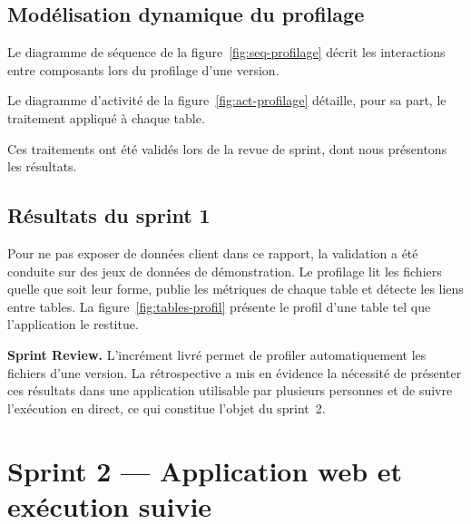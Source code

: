 \subsection{Modélisation dynamique du profilage}

Le diagramme de séquence de la figure~\ref{fig:seq-profilage} décrit les interactions entre composants lors du profilage d'une version.


Le diagramme d'activité de la figure~\ref{fig:act-profilage} détaille, pour sa part, le traitement appliqué à chaque table.


Ces traitements ont été validés lors de la revue de sprint, dont nous présentons les résultats.

\subsection{Résultats du sprint 1}

Pour ne pas exposer de données client dans ce rapport, la validation a été conduite sur des jeux de données de démonstration. Le profilage lit les fichiers quelle que soit leur forme, publie les métriques de chaque table et détecte les liens entre tables. La figure~\ref{fig:tables-profil} présente le profil d'une table tel que l'application le restitue.


\noindent\textbf{Sprint Review.} L'incrément livré permet de profiler automatiquement les fichiers d'une version. La rétrospective a mis en évidence la nécessité de présenter ces résultats dans une application utilisable par plusieurs personnes et de suivre l'exécution en direct, ce qui constitue l'objet du sprint~2.

\section{Sprint 2 — Application web et exécution suivie}

